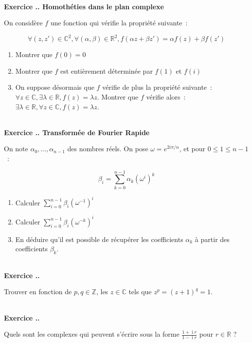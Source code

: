 \documentclass{article}
\newcommand{\im}{\operatorname{i}}
\newcommand{\mb}[1]{\mathbb{#1}}
\newcounter{exo}
\newcommand{\exercice}[1][\null]{\textbf{\\ \large Exercice \thesection.\theexo. \normalsize #1} \addtocounter{exo}{1}}
\begin{document}
\exercice[Homothéties dans le plan complexe]

On considère $f$ une fonction qui vérifie la propriété 
suivante~:

\begin{equation*}
    \forall (z,z') \in \mathbb{C}^2,
    \forall (\alpha, \beta) \in \mathbb{R}^2,
    f( \alpha z + \beta z') = \alpha f (z) + \beta f(z')
\end{equation*}

\begin{enumerate}
    \item Montrer que $f(0) = 0$
    \item Montrer que $f$ est entièrement déterminée 
        par $f(1)$ et $f(i)$

    \item On suppose désormais que $f$ vérifie de plus 
        la propriété suivante~: $\forall z \in \mathbb{C},
        \exists \lambda \in \mathbb{R}, f (z) = \lambda z$.
        Montrer que $f$ vérifie alors~: $\exists \lambda
        \in \mathbb{R}, \forall z \in \mathbb{C}, f(z) = \lambda z$.
\end{enumerate}


\exercice[Transformée de Fourier Rapide]

On note $\alpha_0, \dots, \alpha_{n-1}$ des nombres réels.
On pose $\omega = e^{2i\pi / n}$, et 
pour $0 \leq 1 \leq n - 1$~:

\begin{equation*}
    \beta_i = \sum_{k = 0}^{n-1} \alpha_k (\omega^i)^k
\end{equation*}

\begin{enumerate}
    \item 
        Calculer $\sum_{i = 0}^{n - 1} \beta_i (\omega^{-1})^i$
    \item 
        Calculer $\sum_{i = 0}^{n-1} \beta_i (\omega^{-k})^i$

    \item En déduire qu'il est possible de récupérer les coefficients 
        $\alpha_k$ à partir des coefficients $\beta_k$.
\end{enumerate}



\exercice

Trouver en fonction de $p,q \in \mb{Z}$, les $z \in \mb{C}$ tels que $z^p = (z+1)^q = 1$.

\exercice

Quels sont les complexes qui peuvent s'écrire sous la forme $\frac{1+ \im r}{1- \im r}$ pour $r \in \mb{R}$ ?
\end{document}
